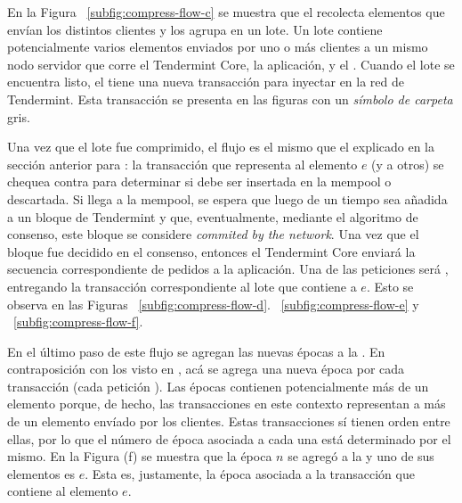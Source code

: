 %

En la Figura ~\ref{subfig:compress-flow-c} se muestra que el \collector recolecta elementos que envían los distintos clientes y los agrupa
en un lote.
Un lote contiene potencialmente varios elementos enviados por uno o más clientes a un mismo nodo servidor
que corre el Tendermint Core, la aplicación, y el \collector.
Cuando el lote se encuentra listo, el \collector tiene una nueva transacción para inyectar en la red de Tendermint.
Esta transacción se presenta en las figuras con un \textit{símbolo de carpeta} gris.

%

Una vez que el lote fue comprimido, el flujo es el mismo que el explicado en la sección anterior para \vanilla: la transacción
que representa al elemento $e$ (y a otros) se chequea contra \CheckTx para determinar si debe ser insertada
en la mempool o descartada.
%
Si llega a la mempool, se espera que luego de un tiempo sea añadida a un bloque de Tendermint y que, eventualmente,
mediante el algoritmo de consenso, este bloque se considere \textit{commited by the network}.
%
Una vez que el bloque fue decidido en el consenso, entonces el Tendermint Core enviará
la secuencia correspondiente de pedidos a la aplicación.
%
Una de las peticiones será \DeliverTx, entregando la transacción correspondiente al lote que contiene a $e$.
%
Esto se observa en las Figuras ~\ref{subfig:compress-flow-d}. ~\ref{subfig:compress-flow-e} y ~\ref{subfig:compress-flow-f}.

%
En el último paso de este flujo se agregan las nuevas épocas a la \setchain.
En contraposición con los visto en \vanilla, acá se agrega una nueva época por cada transacción (cada petición \DeliverTx).
Las épocas contienen potencialmente más de un elemento porque, de hecho, las transacciones en este contexto representan a más de un elemento
envíado por los clientes.
Estas transacciones sí tienen orden entre ellas, por lo que el número de época asociada a cada una está determinado por el mismo.
En la Figura (f) se muestra que la época $n$ se agregó a la \setchain y uno de sus elementos es $e$. Esta es, justamente, la época asociada
a la transacción que contiene al elemento $e$.


